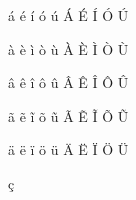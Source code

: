 \documentclass[12pt,a4paper]{article}
\begin{document}
\'a
\'e
\'i
\'o
\'u
\'A
\'E
\'I
\'O
\'U

\`a
\`e
\`i
\`o
\`u
\`A
\`E
\`I
\`O
\`U

\^a
\^e
\^i
\^o
\^u
\^A
\^E
\^I
\^O
\^U

\~a
\~e
\~i
\~o
\~u
\~A
\~E
\~I
\~O
\~U

\"a
\"e
\"i
\"o
\"u
\"A
\"E
\"I
\"O
\"U


\c{c}
\end{document}
